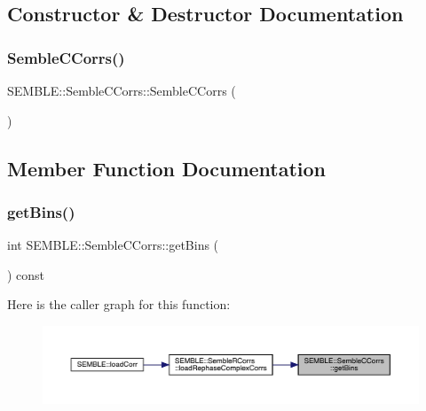 \subsection{Constructor \& Destructor Documentation}
\mbox{\label{classSEMBLE_1_1SembleCCorrs_a16a87863192b0b8933203122230e672e}} 
\subsubsection{\texorpdfstring{SembleCCorrs()}{SembleCCorrs()}}
{\footnotesize\ttfamily S\+E\+M\+B\+L\+E\+::\+Semble\+C\+Corrs\+::\+Semble\+C\+Corrs (\begin{DoxyParamCaption}{ }\end{DoxyParamCaption})}



\subsection{Member Function Documentation}
\mbox{\label{classSEMBLE_1_1SembleCCorrs_aca4e53b5dfff91c60c3072d39e516a33}} 
\subsubsection{\texorpdfstring{getBins()}{getBins()}}
{\footnotesize\ttfamily int S\+E\+M\+B\+L\+E\+::\+Semble\+C\+Corrs\+::get\+Bins (\begin{DoxyParamCaption}{ }\end{DoxyParamCaption}) const}

Here is the caller graph for this function\+:
\nopagebreak
\begin{figure}[H]
\begin{center}
\leavevmode
\includegraphics[width=350pt]{d4/d35/classSEMBLE_1_1SembleCCorrs_aca4e53b5dfff91c60c3072d39e516a33_icgraph}
\end{center}
\end{figure}
\mbox{\label{classSEMBLE_1_1SembleCCorrs_a822cf18e7c93c9fb037d5823aacbd11c}} 
